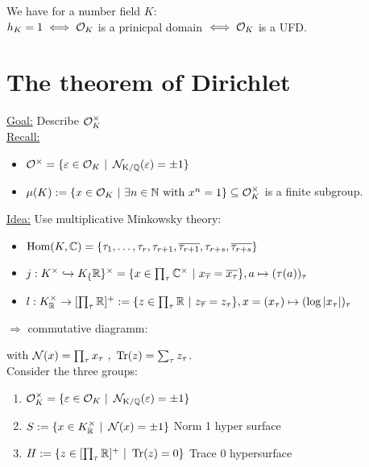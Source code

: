 \begin{Kor}
We have for a number field $K$:\\
$h_K=1 \iff \mathcal{O}_K$ is a prinicpal domain $\iff \mathcal{O}_K$ is a UFD.
\end{Kor}

\section{The theorem of Dirichlet}
\underline{Goal:} Describe $\mathcal{O}^\times_K$\\
\underline{Recall:}
\begin{itemize}
\item $\mathcal{O}^\times= \{\varepsilon \in \mathcal{O}_K \ | \ \operatorname{\mathcal{N}_{K/\mathbb{Q}}}(\varepsilon)= \pm 1\}$
\item $\mu(K):= \{x \in \mathcal{O}_K \ | \ \exists n \in \mathbb{N} \text{ with } x^n=1 \} \subseteq \mathcal{O}_K^\times$ is a finite subgroup.
\end{itemize}
\underline{Idea:} Use multiplicative Minkowsky theory:
\begin{itemize}
\item $\operatorname{Hom}(K, \mathbb{C}) = \{\tau_1, \dots, \tau_r, \tau_{r+1}, \overline{\tau_{r+1}}, \tau_{r+s}, \overline{\tau_{r+s}}\}$
\item $j : K^\times \hookrightarrow K_\{\mathbb{R}\}^\times = \{x \in \prod_\tau \mathbb{C}^\times \ | \ x_{\overline{\tau}} = \overline{x_\tau}\} , a \mapsto (\tau(a))_\tau$
\item $l : K^\times_{\mathbb{R}} \to [\prod_\tau \mathbb{R}]^+ := \{z \in \prod_\tau \mathbb{R} \ | \ z_{\overline{\tau}}=z_\tau \}, x=(x_\tau) \mapsto (\log|x_\tau|)_\tau$
\end{itemize}
$\Rightarrow$ commutative diagramm:\\

with $\Norm(x) = \prod_\tau x_\tau\ ,\ \Tr(z)=\sum_\tau z_\tau$.\\
Consider the three groups:
\begin{enumerate}[(1)]
\item $\mathcal{O}^\times_K = \{ \varepsilon \in \mathcal{O}_K \ | \ \operatorname{\mathcal{N}_{K/\mathbb{Q}}}(\varepsilon)=\pm 1 \}$
\item $S:= \{ x \in K^\times_\R \ | \ \Norm(x) = \pm 1 \}$ \glqq Norm 1 hyper surface\grqq
\item $H:= \{ z \in [\prod_\tau \R]^+ \ | \ \Tr(z)=0\}$ \glqq Trace 0 hypersurface\grqq
\end{enumerate}
